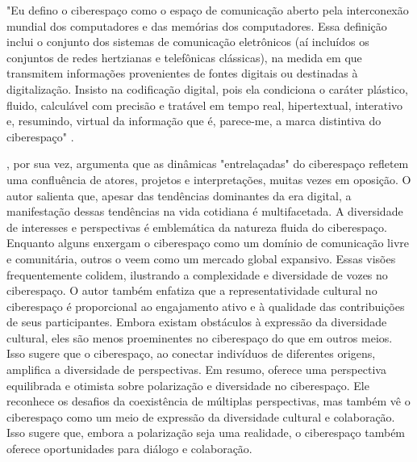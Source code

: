 \begin{citacao}
	"Eu defino o ciberespaço como o espaço de comunicação aberto pela interconexão mundial dos computadores e das memórias dos computadores. Essa definição inclui o conjunto dos sistemas de comunicação eletrônicos (aí incluídos os conjuntos de redes hertzianas e telefônicas clássicas), na medida em que transmitem informações provenientes de fontes digitais ou destinadas à digitalização. Insisto na codificação digital, pois ela condiciona o caráter plástico, fluido, calculável com precisão e tratável em tempo real, hipertextual, interativo e, resumindo, virtual da informação que é, parece-me, a marca distintiva do ciberespaço" \cite[p. 102]{2010_Levy_BOOK}.
\end{citacao}

, por sua vez, argumenta que as dinâmicas "entrelaçadas" do ciberespaço refletem uma confluência de atores, projetos e interpretações, muitas vezes em oposição. O autor salienta que, apesar das tendências dominantes da era digital, a manifestação dessas tendências na vida cotidiana é multifacetada. A diversidade de interesses e perspectivas é emblemática da natureza fluida do ciberespaço. Enquanto alguns enxergam o ciberespaço como um domínio de comunicação livre e comunitária, outros o veem como um mercado global expansivo. Essas visões frequentemente colidem, ilustrando a complexidade e diversidade de vozes no ciberespaço. O autor também enfatiza que a representatividade cultural no ciberespaço é proporcional ao engajamento ativo e à qualidade das contribuições de seus participantes. Embora existam obstáculos à expressão da diversidade cultural, eles são menos proeminentes no ciberespaço do que em outros meios. Isso sugere que o ciberespaço, ao conectar indivíduos de diferentes origens, amplifica a diversidade de perspectivas. Em resumo,  oferece uma perspectiva equilibrada e otimista sobre polarização e diversidade no ciberespaço. Ele reconhece os desafios da coexistência de múltiplas perspectivas, mas também vê o ciberespaço como um meio de expressão da diversidade cultural e colaboração. Isso sugere que, embora a polarização seja uma realidade, o ciberespaço também oferece oportunidades para diálogo e colaboração.

